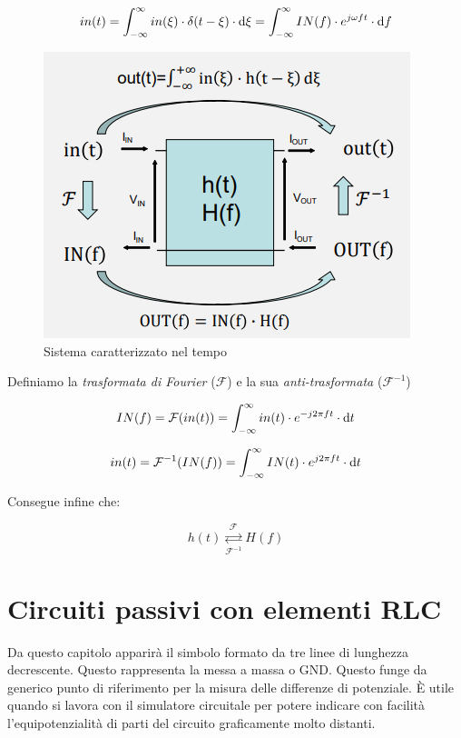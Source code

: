 \documentclass{article}
\begin{document}
\[in(t) = \int_{-\infty}^{\infty} in(\xi) \cdot \delta (t - \xi) \cdot \textrm{d} \xi = \int_{-\infty}^{\infty} IN (f) \cdot e^{j \omega f t} \cdot \textrm d f\]

\begin{figure}[h]
  \centering
  \includegraphics[scale=0.7]{IM_trasformata_fourier}
  \caption{Sistema caratterizzato nel tempo}
  \label{Schema_trasformata_fourier}
\end{figure}

Definiamo la \textit{trasformata di Fourier} ($\mathcal{F}$) e la sua \textit{anti-trasformata} ($\mathcal{F}^{-1}$)

\[IN (f) = \mathcal{F} (in(t)) = \int_{-\infty}^{\infty} in(t) \cdot e^{-j2\pi ft} \cdot \textrm d t\]

\[in (t) = \mathcal{F}^{-1} (IN(f)) = \int_{-\infty}^{\infty} IN(t) \cdot e^{j2\pi ft} \cdot \textrm d t\]

Consegue infine che:

\[h(t) \underset{\mathcal{F}^{-1}}{\overset{\mathcal{F}}{\rightleftarrows}} H(f)\]

\clearpage












\section{Circuiti passivi con elementi RLC}

Da questo capitolo apparirà il simbolo formato da tre linee di lunghezza decrescente. Questo rappresenta la messa a massa o GND. Questo funge da generico punto di riferimento per la misura delle differenze di potenziale. È utile quando si lavora con il simulatore circuitale per potere indicare con facilità l'equipotenzialità di parti del circuito graficamente molto distanti. 
\end{document}

